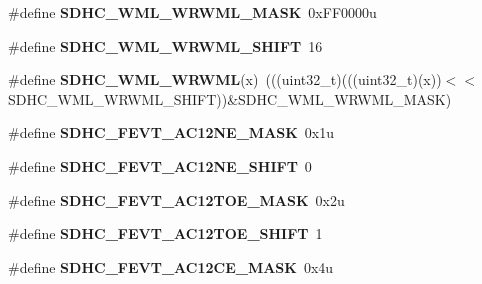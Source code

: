 \begin{DoxyCompactItemize}
\item 
\#define {\bfseries S\+D\+H\+C\+\_\+\+W\+M\+L\+\_\+\+W\+R\+W\+M\+L\+\_\+\+M\+A\+SK}~0x\+F\+F0000u\hypertarget{group__SDHC__Register__Masks_gabfe9926c62d373c8d28b1bcc7ba0010f}{}\label{group__SDHC__Register__Masks_gabfe9926c62d373c8d28b1bcc7ba0010f}

\item 
\#define {\bfseries S\+D\+H\+C\+\_\+\+W\+M\+L\+\_\+\+W\+R\+W\+M\+L\+\_\+\+S\+H\+I\+FT}~16\hypertarget{group__SDHC__Register__Masks_ga026a7e92688832bffea0905554f30253}{}\label{group__SDHC__Register__Masks_ga026a7e92688832bffea0905554f30253}

\item 
\#define {\bfseries S\+D\+H\+C\+\_\+\+W\+M\+L\+\_\+\+W\+R\+W\+ML}(x)~(((uint32\+\_\+t)(((uint32\+\_\+t)(x))$<$$<$S\+D\+H\+C\+\_\+\+W\+M\+L\+\_\+\+W\+R\+W\+M\+L\+\_\+\+S\+H\+I\+FT))\&S\+D\+H\+C\+\_\+\+W\+M\+L\+\_\+\+W\+R\+W\+M\+L\+\_\+\+M\+A\+SK)\hypertarget{group__SDHC__Register__Masks_gaab80c8d04a4c7c27fb4f5b24d1622945}{}\label{group__SDHC__Register__Masks_gaab80c8d04a4c7c27fb4f5b24d1622945}

\item 
\#define {\bfseries S\+D\+H\+C\+\_\+\+F\+E\+V\+T\+\_\+\+A\+C12\+N\+E\+\_\+\+M\+A\+SK}~0x1u\hypertarget{group__SDHC__Register__Masks_ga9f03ca4771ba7ba7dd17652cc0b3523f}{}\label{group__SDHC__Register__Masks_ga9f03ca4771ba7ba7dd17652cc0b3523f}

\item 
\#define {\bfseries S\+D\+H\+C\+\_\+\+F\+E\+V\+T\+\_\+\+A\+C12\+N\+E\+\_\+\+S\+H\+I\+FT}~0\hypertarget{group__SDHC__Register__Masks_gaaa25d15ca9ece7802c84eaabfcb610a3}{}\label{group__SDHC__Register__Masks_gaaa25d15ca9ece7802c84eaabfcb610a3}

\item 
\#define {\bfseries S\+D\+H\+C\+\_\+\+F\+E\+V\+T\+\_\+\+A\+C12\+T\+O\+E\+\_\+\+M\+A\+SK}~0x2u\hypertarget{group__SDHC__Register__Masks_ga08461177de9d00d32471a042648a0d67}{}\label{group__SDHC__Register__Masks_ga08461177de9d00d32471a042648a0d67}

\item 
\#define {\bfseries S\+D\+H\+C\+\_\+\+F\+E\+V\+T\+\_\+\+A\+C12\+T\+O\+E\+\_\+\+S\+H\+I\+FT}~1\hypertarget{group__SDHC__Register__Masks_ga655231f1f3f9422f32cf26cfdb56b7d2}{}\label{group__SDHC__Register__Masks_ga655231f1f3f9422f32cf26cfdb56b7d2}

\item 
\#define {\bfseries S\+D\+H\+C\+\_\+\+F\+E\+V\+T\+\_\+\+A\+C12\+C\+E\+\_\+\+M\+A\+SK}~0x4u\hypertarget{group__SDHC__Register__Masks_gabbde9b3a4bf7a5ba098a8793459a93e3}{}\label{group__SDHC__Register__Masks_gabbde9b3a4bf7a5ba098a8793459a93e3}


\end{DoxyCompactItemize}
